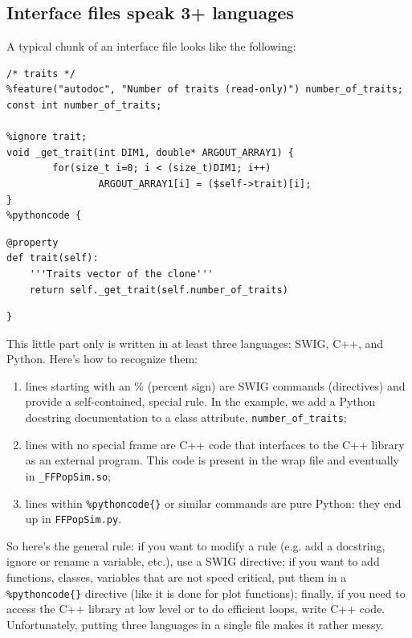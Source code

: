 \documentclass[12pt,a4paper,notitlepage,onecolumn]{article}
\begin{document}
\subsection{Interface files speak 3+ languages}
A typical chunk of an interface file looks like the following:
\begin{verbatim}
/* traits */
%feature("autodoc", "Number of traits (read-only)") number_of_traits;
const int number_of_traits;

%ignore trait;
void _get_trait(int DIM1, double* ARGOUT_ARRAY1) {
        for(size_t i=0; i < (size_t)DIM1; i++)
                ARGOUT_ARRAY1[i] = ($self->trait)[i];
}
%pythoncode {
\end{verbatim}
\vspace{-4ex}
\begin{verbatim}
@property
def trait(self):
    '''Traits vector of the clone'''
    return self._get_trait(self.number_of_traits)
\end{verbatim}
\vspace{-4ex}
\begin{verbatim}
}
\end{verbatim}
This little part only is written in at least three languages: SWIG, C++, and
Python. Here's how to recognize them:
\begin{enumerate}
\item lines starting with an \% (percent sign) are SWIG commands (directives)
and provide a self-contained, special rule. In the example, we add a Python
docstring documentation to a class attribute, \texttt{number\_of\_traits};
\item lines with no special frame are C++ code that interfaces to the C++ library
as an external program. This code is present in the wrap file and eventually in
\texttt{\_FFPopSim.so};
\item lines within \texttt{\%pythoncode\{\}} or similar commands are pure
Python: they end up in \texttt{FFPopSim.py}.
\end{enumerate}
So here's the general rule: if you want to modify a rule (e.g. add a docstring,
ignore or rename a variable, etc.), use a SWIG directive; if you want to add
functions, classes, variables that are not speed critical, put them in a
\texttt{\%pythoncode\{\}} directive (like it is done for plot functions);
finally, if you need to access the C++ library at low level or to do efficient
loops, write C++ code. Unfortunately, putting three languages in a single file
makes it rather messy.
\end{document}
